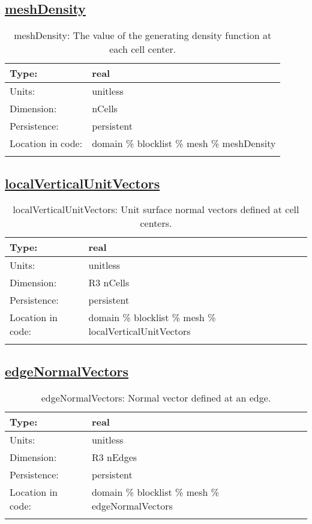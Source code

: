 \subsection[meshDensity]{\hyperref[sec:var_tab_mesh]{meshDensity}}
\label{subsec:var_sec_mesh_meshDensity}
\begin{center}
\begin{longtable}{| p{2.0in} | p{4.0in} |}
        \hline 
        Type: & real \\
        \hline 
        Units: & \si{unitless} \\
        \hline 
        Dimension: & nCells \\
        \hline 
        Persistence: & persistent \\
        \hline 
         Location in code: & domain \% blocklist \% mesh \% meshDensity \\
         \hline 
    \caption{meshDensity: The value of the generating density function at each cell center.}
\end{longtable}
\end{center}
\subsection[localVerticalUnitVectors]{\hyperref[sec:var_tab_mesh]{localVerticalUnitVectors}}
\label{subsec:var_sec_mesh_localVerticalUnitVectors}
\begin{center}
\begin{longtable}{| p{2.0in} | p{4.0in} |}
        \hline 
        Type: & real \\
        \hline 
        Units: & \si{unitless} \\
        \hline 
        Dimension: & R3 nCells \\
        \hline 
        Persistence: & persistent \\
        \hline 
         Location in code: & domain \% blocklist \% mesh \% localVerticalUnitVectors \\
         \hline 
    \caption{localVerticalUnitVectors: Unit surface normal vectors defined at cell centers.}
\end{longtable}
\end{center}
\subsection[edgeNormalVectors]{\hyperref[sec:var_tab_mesh]{edgeNormalVectors}}
\label{subsec:var_sec_mesh_edgeNormalVectors}
\begin{center}
\begin{longtable}{| p{2.0in} | p{4.0in} |}
        \hline 
        Type: & real \\
        \hline 
        Units: & \si{unitless} \\
        \hline 
        Dimension: & R3 nEdges \\
        \hline 
        Persistence: & persistent \\
        \hline 
         Location in code: & domain \% blocklist \% mesh \% edgeNormalVectors \\
         \hline 
    \caption{edgeNormalVectors: Normal vector defined at an edge.}
\end{longtable}
\end{center}

